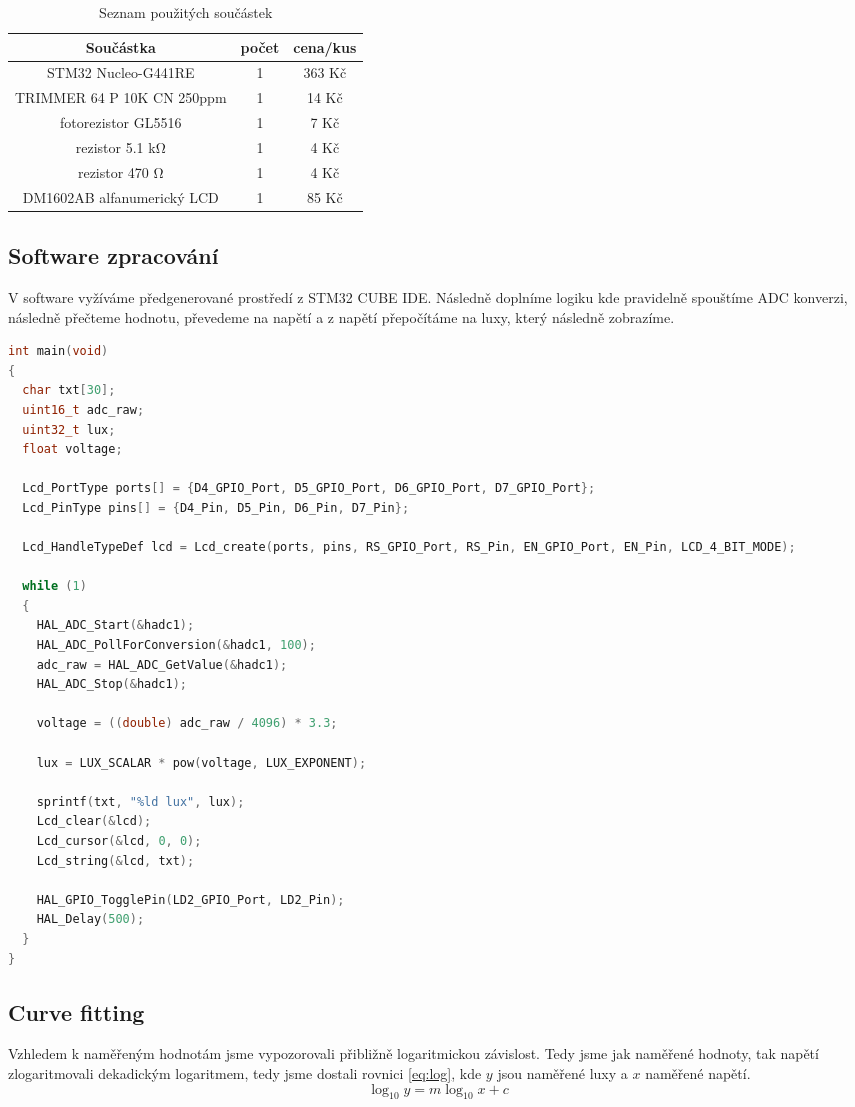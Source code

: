 \documentclass[a4paper,10pt,titlepage]{article}
\begin{document}
\begin{table}[h]
 \centering
 \begin{tabular}{c || c | c }
  Součástka & počet & cena/kus \\ \hline \hline
  STM32 Nucleo-G441RE & 1 & 363 Kč \\ \hline
  TRIMMER 64 P 10K CN 250ppm & 1 & 14 Kč \\ \hline
  fotorezistor GL5516 & 1 & 7 Kč \\ \hline
  rezistor 5.1 \si{\kilo\ohm} & 1 & 4 Kč \\ \hline
  rezistor 470 \si{\ohm} & 1 & 4 Kč \\ \hline
  DM1602AB alfanumerický LCD & 1 & 85 Kč
 \end{tabular}
  \caption{Seznam použitých součástek}
\end{table}


\subsection{Software zpracování}
V software vyžíváme předgenerované prostředí z STM32 CUBE IDE. Následně doplníme logiku kde pravidelně spouštíme ADC konverzi, následně přečteme hodnotu, převedeme na napětí a z napětí přepočítáme na luxy, který následně zobrazíme.

\begin{lstlisting}[language=c, breaklines=true]
 int main(void)
{
  char txt[30];
  uint16_t adc_raw;
  uint32_t lux;
  float voltage;

  Lcd_PortType ports[] = {D4_GPIO_Port, D5_GPIO_Port, D6_GPIO_Port, D7_GPIO_Port};
  Lcd_PinType pins[] = {D4_Pin, D5_Pin, D6_Pin, D7_Pin};

  Lcd_HandleTypeDef lcd = Lcd_create(ports, pins, RS_GPIO_Port, RS_Pin, EN_GPIO_Port, EN_Pin, LCD_4_BIT_MODE);

  while (1)
  {
	HAL_ADC_Start(&hadc1);
	HAL_ADC_PollForConversion(&hadc1, 100);
	adc_raw = HAL_ADC_GetValue(&hadc1);
	HAL_ADC_Stop(&hadc1);

	voltage = ((double) adc_raw / 4096) * 3.3;

	lux = LUX_SCALAR * pow(voltage, LUX_EXPONENT);

	sprintf(txt, "%ld lux", lux);
	Lcd_clear(&lcd);
	Lcd_cursor(&lcd, 0, 0);
	Lcd_string(&lcd, txt);

	HAL_GPIO_TogglePin(LD2_GPIO_Port, LD2_Pin);
	HAL_Delay(500);
  }
}
\end{lstlisting}

\subsection{Curve fitting}
Vzhledem k naměřeným hodnotám jsme vypozorovali přibližně logaritmickou závislost. Tedy jsme jak naměřené hodnoty, tak napětí zlogaritmovali dekadickým logaritmem, tedy jsme dostali rovnici \ref{eq:log}, kde $y$ jsou naměřené luxy a $x$ naměřené napětí.
\begin{equation}
 \label{eq:log}
 \log_{10}{y} = m \log_{10}{x} + c
\end{equation}
\end{document}

